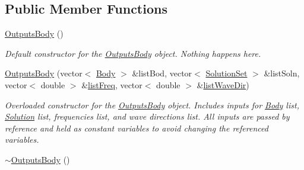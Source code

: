\subsection*{Public Member Functions}
\begin{DoxyCompactItemize}
\item 
\hypertarget{class_outputs_body_a6898483a0919f9bb9cd82e3036a59a14}{\hyperlink{class_outputs_body_a6898483a0919f9bb9cd82e3036a59a14}{Outputs\-Body} ()}\label{class_outputs_body_a6898483a0919f9bb9cd82e3036a59a14}

\begin{DoxyCompactList}\small\item\em Default constructor for the \hyperlink{class_outputs_body}{Outputs\-Body} object. Nothing happens here. \end{DoxyCompactList}\item 
\hyperlink{class_outputs_body_a2055cae4d0cd0ae53ec3afc6b05f0b70}{Outputs\-Body} (vector$<$ \hyperlink{class_body}{Body} $>$ \&list\-Bod, vector$<$ \hyperlink{class_solution_set}{Solution\-Set} $>$ \&list\-Soln, vector$<$ double $>$ \&\hyperlink{class_outputs_body_a6b28621ef475c1d917270e2259e1629f}{list\-Freq}, vector$<$ double $>$ \&\hyperlink{class_outputs_body_a710a66d19fb8ba5a6c9c15e0143f832e}{list\-Wave\-Dir})
\begin{DoxyCompactList}\small\item\em Overloaded constructor for the \hyperlink{class_outputs_body}{Outputs\-Body} object. Includes inputs for \hyperlink{class_body}{Body} list, \hyperlink{class_solution}{Solution} list, frequencies list, and wave directions list. All inputs are passed by reference and held as constant variables to avoid changing the referenced variables. \end{DoxyCompactList}\item 
\hypertarget{class_outputs_body_a9ec0c3721f511168c425b792bdaf2d62}{\hyperlink{class_outputs_body_a9ec0c3721f511168c425b792bdaf2d62}{$\sim$\-Outputs\-Body} ()}\label{class_outputs_body_a9ec0c3721f511168c425b792bdaf2d62}


\end{DoxyCompactItemize}

